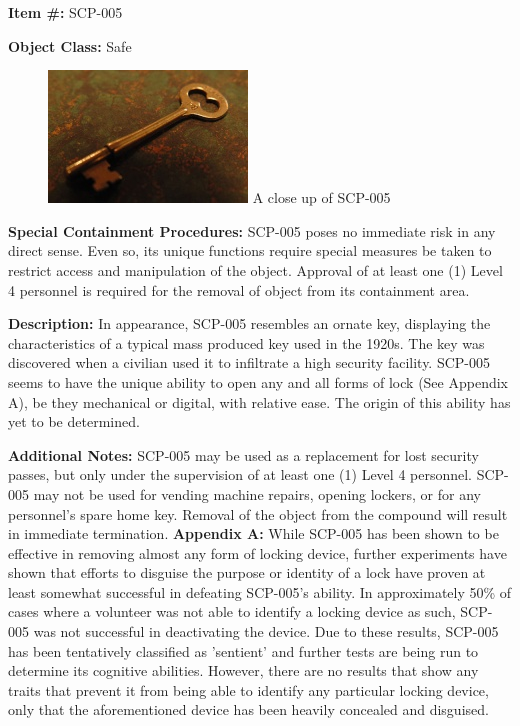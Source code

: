 \textbf{Item \#:} SCP-005

\textbf{Object Class:} Safe

\begin{figure}[h]
\begin{center}
\includegraphics[scale=1]{scp/005.jpg}
\linebreak A close up of SCP-005
\end{center}
\end{figure}

\textbf{Special Containment Procedures:} SCP-005 poses no immediate risk in any direct sense. Even so, its unique functions require special measures be taken to restrict access and manipulation of the object. Approval of at least one (1) Level 4 personnel is required for the removal of object from its containment area.

\textbf{Description:} In appearance, SCP-005 resembles an ornate key, displaying the characteristics of a typical mass produced key used in the 1920s. The key was discovered when a civilian used it to infiltrate a high security facility. SCP-005 seems to have the unique ability to open any and all forms of lock (See Appendix A), be they mechanical or digital, with relative ease. The origin of this ability has yet to be determined.

\textbf{Additional Notes:} SCP-005 may be used as a replacement for lost security passes, but only under the supervision of at least one (1) Level 4 personnel. SCP-005 may not be used for vending machine repairs, opening lockers, or for any personnel's spare home key. Removal of the object from the compound will result in immediate termination.
\newpage
\textbf{Appendix A:} While SCP-005 has been shown to be effective in removing almost any form of locking device, further experiments have shown that efforts to disguise the purpose or identity of a lock have proven at least somewhat successful in defeating SCP-005's ability. In approximately 50\% of cases where a volunteer was not able to identify a locking device as such, SCP-005 was not successful in deactivating the device. Due to these results, SCP-005 has been tentatively classified as 'sentient' and further tests are being run to determine its cognitive abilities. However, there are no results that show any traits that prevent it from being able to identify any particular locking device, only that the aforementioned device has been heavily concealed and disguised.